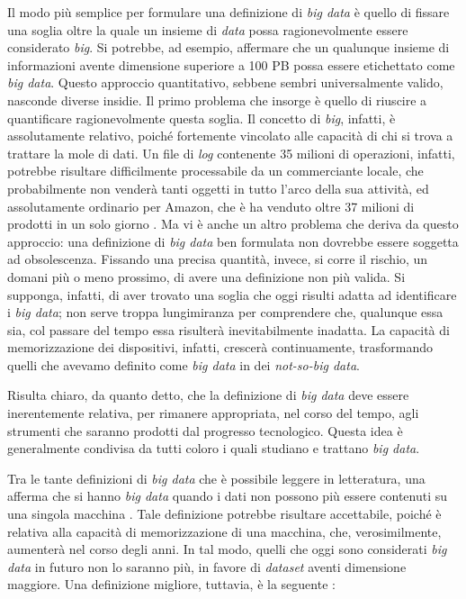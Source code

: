 Il modo più semplice per formulare una definizione di \textit{big data} è quello di fissare una soglia oltre la quale un insieme di \textit{data} possa ragionevolmente essere considerato \textit{big}. 
Si potrebbe, ad esempio, affermare che un qualunque insieme di informazioni avente dimensione superiore a 100 PB possa essere etichettato come \textit{big data}. 
Questo approccio quantitativo, sebbene sembri universalmente valido, nasconde diverse insidie. Il primo problema che insorge è quello di riuscire a quantificare 
ragionevolmente questa soglia. Il concetto di \textit{big}, infatti, è assolutamente relativo, poiché fortemente vincolato alle capacità di chi si trova a trattare la mole di dati. 
Un file di \textit{log} contenente 35 milioni di operazioni, infatti, potrebbe risultare difficilmente processabile da un commerciante locale, che probabilmente non venderà tanti oggetti 
in tutto l’arco della sua attività, ed assolutamente ordinario per Amazon, che è ha venduto oltre 37 milioni di prodotti in un solo giorno \cite{URL:cybermon}.
Ma vi è anche un altro problema che deriva da questo approccio: una definizione di \textit{big data} ben 
formulata non dovrebbe essere soggetta ad obsolescenza. Fissando una precisa quantità, invece, si corre il rischio, un domani più o meno prossimo, di avere una definizione
non più valida. Si supponga, infatti, di aver trovato una soglia che oggi risulti adatta ad identificare i \textit{big data}; non serve troppa lungimiranza per comprendere che, 
qualunque essa sia, col passare del tempo essa risulterà inevitabilmente inadatta. La capacità di memorizzazione dei dispositivi, infatti, crescerà continuamente, trasformando 
quelli che avevamo definito come \textit{big data} in dei \textit{not-so-big data}.

Risulta chiaro, da quanto detto, che la definizione di \textit{big data} deve essere inerentemente relativa, per rimanere appropriata, nel corso del tempo, agli strumenti che saranno 
prodotti dal progresso tecnologico. Questa idea è generalmente condivisa da tutti coloro i quali studiano e trattano \textit{big data}.

Tra le tante definizioni di \textit{big data} che è possibile leggere in letteratura, una afferma che si hanno \textit{big data} quando i dati non possono più essere contenuti 
su una singola macchina \cite{hbase:def1}. Tale definizione potrebbe risultare accettabile, poiché è relativa alla capacità di memorizzazione di una macchina, che, 
verosimilmente, aumenterà nel corso degli anni. In tal 
modo, quelli che oggi sono considerati \textit{big data} in futuro non lo saranno più, in favore di \textit{dataset} aventi dimensione maggiore. Una definizione migliore, tuttavia, è la seguente \cite{hbase:def1}:

